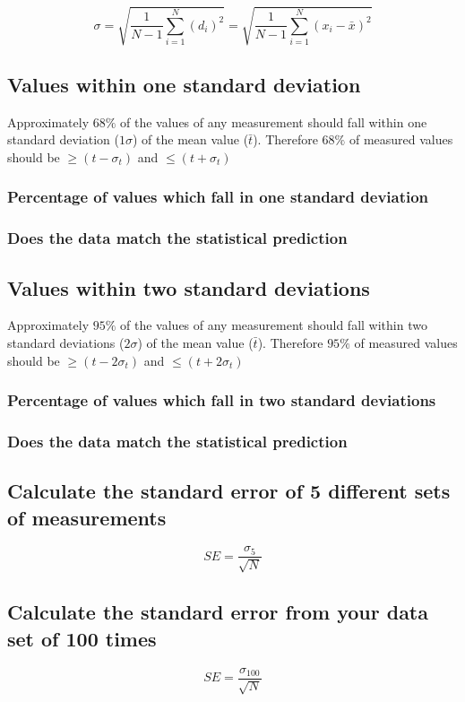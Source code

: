 \documentclass[11pt, letterpaper, includehead]{article}
\begin{document}
  $$\sigma = \sqrt{\frac{1}{N - 1}\sum_{i = 1}^{N} (d_i)^2} = \sqrt{\frac{1}{N - 1}\sum_{i = 1}^{N} (x_i - \bar{x})^2}$$

  \subsection{Values within one standard deviation} %
  Approximately $68\%$ of the values of any measurement should fall within one 
  standard deviation ($1 \sigma$) of the mean value ($\bar{t}$). Therefore $68\%$ of measured 
  values should be $\geq (t - \sigma_t)$ and $\leq (t + \sigma_t)$

  \subsubsection{Percentage of values which fall in one standard deviation}

  \subsubsection{Does the data match the statistical prediction}

  \subsection{Values within two standard deviations} %
  Approximately $95\%$ of the values of any measurement should fall within two 
  standard deviations ($2 \sigma$) of the mean value ($\bar{t}$). Therefore $95\%$ of measured 
  values should be $\geq (t - 2 \sigma_t)$ and $\leq (t + 2 \sigma_t)$

  \subsubsection{Percentage of values which fall in two standard deviations}

  \subsubsection{Does the data match the statistical prediction}

  \subsection{Calculate the standard error of 5 different sets of measurements}

  $$SE = \frac{\sigma_{5}}{\sqrt{N}}$$

  \subsection{Calculate the standard error from your data set of 100 times}

  $$SE = \frac{\sigma_{100}}{\sqrt{N}}$$
  
\end{document}
